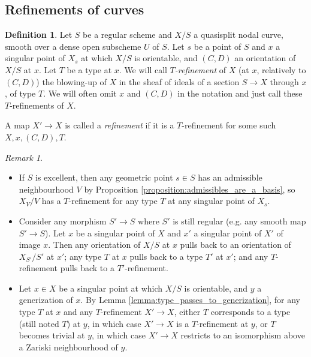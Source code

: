\documentclass[a4paper,10pt,twoside]{article}
\newcommand{\ra}{\rightarrow}
\theoremstyle{definition}
\newtheorem{defi}[thm]{Definition}
\theoremstyle{remark}
\newtheorem{rem}{Remark}[thm]
\begin{document}
\subsection{Refinements of curves}


\begin{defi}\label{definition refinement}
Let $S$ be a regular scheme and $X/S$ a quasisplit nodal curve, smooth over a dense open subscheme $U$ of $S$. Let $s$ be a point of $S$ and $x$ a singular point of $X_s$ at which $X/S$ is orientable, and $(C,D)$ an orientation of $X/S$ at $x$. Let $T$ be a type at $x$. We will call \emph{$T$-refinement} of $X$ (at $x$, relatively to $(C,D)$) the blowing-up of $X$ in the sheaf of ideals of a section $S\ra X$ through $x$, of type $T$. We will often omit $x$ and $(C,D)$ in the notation and just call these $T$-refinements of $X$.

A map $X'\ra X$ is called a \emph{refinement} if it is a $T$-refinement for some such $X,x,(C,D),T$.
\end{defi}

\begin{rem}\label{remarque les raffinements asymetriques existent et-localement et base change compatibles}
\begin{itemize}
\item If $S$ is excellent, then any geometric point $s\in S$ has an admissible neighbourhood $V$ by Proposition \ref{proposition:admissibles_are_a_basis}, so $X_V/V$ has a $T$-refinement for any type $T$ at any singular point of $X_s$.
\item Consider any morphism $S' \to S$ where $S'$ is still regular (e.g. any smooth map $S' \to S$). Let $x$ be a singular point of $X$ and $x'$ a singular point of $X'$ of image $x$. Then any orientation of $X/S$ at $x$ pulls back to an orientation of $X_{S'}/S'$ at $x'$; any type $T$ at $x$ pulls back to a type $T'$ at $x'$; and any $T$-refinement pulls back to a $T'$-refinement.
\item Let $x \in X$ be a singular point at which $X/S$ is orientable, and $y$ a generization of $x$. By Lemma \ref{lemma:type_passes_to_generization}, for any type $T$ at $x$ and any $T$-refinement $X'\to X$, either $T$ corresponds to a type (still noted $T$) at $y$, in which case $X'\to X$ is a $T$-refinement at $y$, or $T$ becomes trivial at $y$, in which case $X'\to X$ restricts to an isomorphism above a Zariski neighbourhood of $y$.
\end{itemize}
\end{rem}
\end{document}
